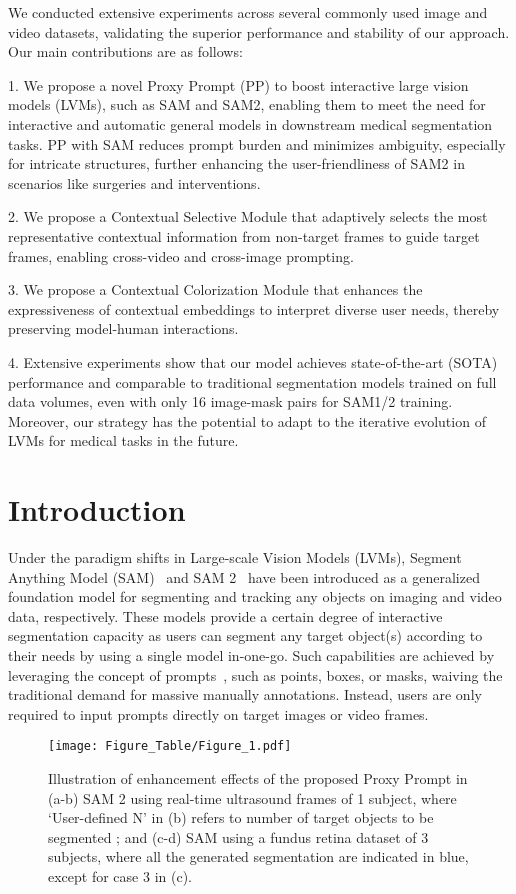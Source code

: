 We conducted extensive experiments across several commonly used image and video datasets, validating the superior performance and stability of our approach. Our main contributions are as follows:

1. We propose a novel Proxy Prompt (PP) to boost interactive large vision models (LVMs), such as SAM and SAM2, enabling them to meet the need for interactive and automatic general models in downstream medical segmentation tasks. PP with SAM reduces prompt burden and minimizes ambiguity, especially for intricate structures, further enhancing the user-friendliness of SAM2 in scenarios like surgeries and interventions.

2. We propose a Contextual Selective Module that adaptively selects the most representative contextual information from non-target frames to guide target frames, enabling cross-video and cross-image prompting.

3. We propose a Contextual Colorization Module that enhances the expressiveness of contextual embeddings to interpret diverse user needs, thereby preserving model-human interactions.

4. Extensive experiments show that our model achieves state-of-the-art (SOTA) performance and comparable to traditional segmentation models trained on full data volumes, even with only 16 image-mask pairs for SAM1/2 training. Moreover, our strategy has the potential to adapt to the iterative evolution of LVMs for medical tasks in the future.


\section{Introduction}
\label{sec:intro}

Under the paradigm shifts in Large-scale Vision Models (LVMs), Segment Anything Model (SAM)~\cite{kirillov2023segment} and SAM 2~\cite{ravi2024sam} have been introduced as a generalized foundation model for segmenting and tracking any objects on imaging and video data, respectively. These models provide a certain degree of interactive segmentation capacity as users can segment any target object(s) according to their needs by using a single model in-one-go. Such capabilities are achieved by leveraging the concept of prompts~\cite{wang2023review}, such as points, boxes, or masks, waiving the traditional demand for massive manually annotations. Instead, users are only required to input prompts directly on target images or video frames.

\begin{figure}[t]
  \centering
  \setlength{\abovecaptionskip}{3pt}
   \texttt{[image: Figure\_Table/Figure\_1.pdf]}
   \caption{Illustration of enhancement effects of the proposed Proxy Prompt in (a-b) SAM 2 using real-time ultrasound frames of 1 subject, where `User-defined N' in (b) refers to number of target objects to be segmented ; and (c-d) SAM using a fundus retina dataset of 3 subjects, where all the generated segmentation are indicated in blue, except for case 3 in (c).}
   \label{fig:Figure1}
   \vspace{-15pt}
\end{figure}

